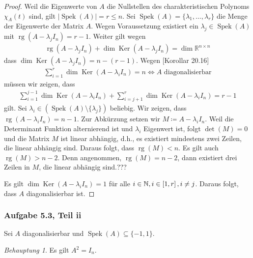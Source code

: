 \documentclass[draft,a5paper]{article}
\theoremstyle{remark}
\newtheorem*{beh}{Behauptung}
\DeclareMathOperator{\Spek}{Spek}
\DeclareMathOperator{\Ker}{Ker}
\DeclareMathOperator{\rg}{rg}
\newcommand{\envert}[1]{\left\lvert#1\right\rvert}
\newcommand{\interval}[1]{\mathinner{#1}}
\begin{document}
\begin{proof}
  Weil die Eigenwerte von \(A\) die Nullstellen des charakteristischen
  Polynoms \(\chi_{A}(t)\) sind, gilt \(\envert{\Spek(A)} = r \le n\).  Sei
  \(\Spek(A) = \{\lambda_{1}, \ldots, \lambda_{r}\}\) die Menge der Eigenwerte der
  Matrix \(A\).  Wegen Voraussetzung existiert ein
  \(\lambda_{j} \in \Spek(A)\) mit
  \(\rg(A - \lambda_{j}I_{n}) = r - 1\). Weiter gilt wegen
  \begin{align*}
    \rg(A - \lambda_{j}I_{n}) + \dim \Ker(A - \lambda_{j}I_{n}) = \dim \mathbb{R}^{n \times n}
  \end{align*}
  dass \(\dim \Ker(A - \lambda_{j}I_{n}) = n - (r - 1)\).  Wegen [Korollar
  20.16]
  \begin{align*}
    \sum_{i=1}^{r}{\dim \Ker(A - \lambda_{i}I_{n})} = n \iff \text{\(A\) diagonalisierbar}
  \end{align*}
  müssen wir zeigen, dass
  \begin{align*}
    \sum_{i=1}^{j-1}{\dim \Ker(A - \lambda_{i}I_{n})}
    + \sum_{i=j+1}^{r}{\dim \Ker(A - \lambda_{i}I_{n})}
    = r - 1
  \end{align*}
  gilt.  Sei \(\lambda_{i} \in (\Spek(A) \setminus \{\lambda_{j}\})\) beliebig.  Wir zeigen,
  dass \(\rg(A - \lambda_{i}I_{n}) = n - 1\).  Zur Abkürzung setzen wir
  \(M \coloneq A - \lambda_{i}I_{n}\).  Weil die Determinant Funktion alternierend
  ist und \(\lambda_{i}\) Eigenwert ist, folgt \(\det(M) = 0\) und die
  Matrix \(M\) ist linear abhängig, d.h., es existiert mindestens zwei
  Zeilen, die linear abhängig sind.  Daraus folgt, dass
  \(\rg(M) < n\).  Es gilt auch \(\rg(M) > n - 2\).  Denn angenommen,
  \(\rg(M) = n - 2\), dann existiert drei Zeilen in \(M\), die linear
  abhängig sind.???

  Es gilt \(\dim \Ker(A -
  \lambda_{i}I_{n}) = 1\) für alle \(i \in \mathbb{N}, i \in \interval{[1, r]}, i \ne j\).
  Daraus folgt, dass \(A\) diagonalisierbar ist.
\end{proof}

\subsubsection*{Aufgabe 5.3, Teil ii}

Sei \(A\) diagonalisierbar und \(\Spek(A) \subseteq \{-1, 1\}\).

\begin{beh}
  Es gilt \(A^{2}=I_{n}\).
\end{beh}
\end{document}
